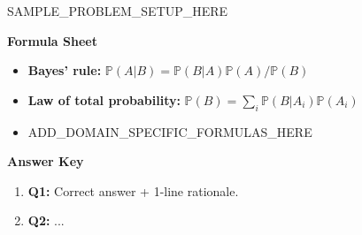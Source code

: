 \documentclass[11pt,addpoints]{exam}
\newcommand{\PR}{\mathbb{P}}
\newcommand{\1}{\mathbf{1}}
\begin{document}
\begin{questions}
\question[10]
SAMPLE_PROBLEM_SETUP_HERE


\end{questions}

\newpage
\begin{center}
  {\large \textbf{Formula Sheet}}
\end{center}

\begin{itemize}[leftmargin=*]
  \item \textbf{Bayes' rule:} $\PR(A|B) = \PR(B|A)\PR(A)/\PR(B)$
  \item \textbf{Law of total probability:} $\PR(B)=\sum_i \PR(B|A_i)\PR(A_i)$
  \item ADD_DOMAIN_SPECIFIC_FORMULAS_HERE
\end{itemize}

\newpage
\printanswers   %
\begin{center}
  {\Large \textbf{Answer Key}}
\end{center}

\begin{enumerate}[leftmargin=*]
  \item \textbf{Q1:} Correct answer + 1-line rationale.
  \item \textbf{Q2:} ...
\end{enumerate}
\end{document}
